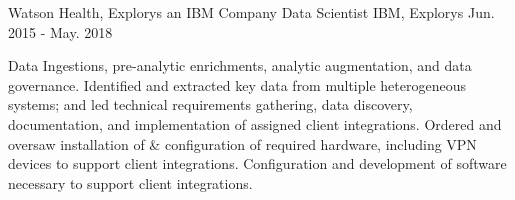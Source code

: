 \begin{cventries}
  \cventry
    {Watson Health, Explorys an IBM Company} %
    {Data Scientist} %
    {IBM, Explorys} %
    {Jun. 2015 - May. 2018} %
    {
      \begin{cvparagraph}
        Data Ingestions, pre-analytic enrichments, analytic augmentation, and data governance.  Identified and extracted key data from multiple heterogeneous systems; and led technical requirements gathering, data discovery, documentation, and implementation of assigned client integrations.  Ordered and oversaw installation of \& configuration of required hardware, including VPN devices to support client integrations.  Configuration and development of software necessary to support client integrations.
      \end{cvparagraph}
    }


\end{cventries}
